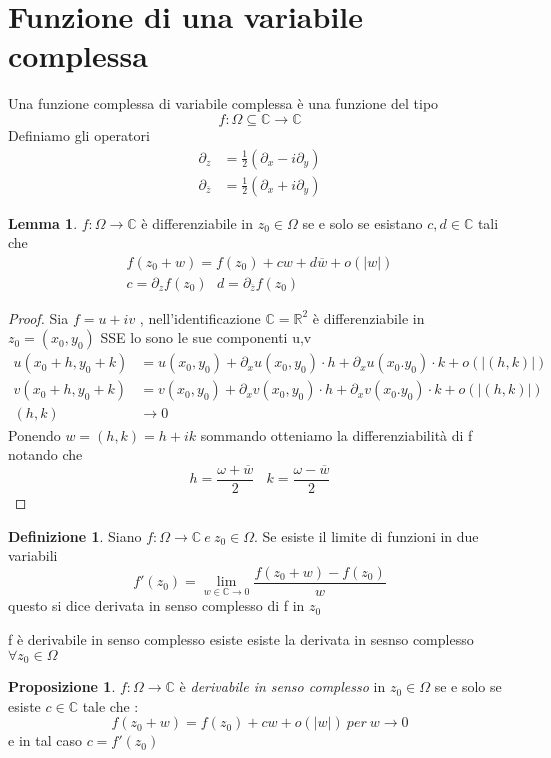\documentclass{article}
\theoremstyle{definition}
\newtheorem*{definizione}{Definizione}
\newtheorem*{proposizione}{Proposizione}
\newtheorem*{lemma}{Lemma}
\newcommand{\R}{\mathbb{R}}
\newcommand{\C}{\mathbb{C}}
\newcommand{\norm}[1]{|#1|}
\begin{document}
\section{Funzione di una variabile complessa}
Una funzione complessa di variabile complessa è una funzione del tipo 
$$f:\Omega \subseteq \mathbb{C} \rightarrow \mathbb{C}$$
Definiamo gli operatori 
\begin{align*}
	\partial_z&=\frac{1}{2}(\partial_x - i \partial_y)\\
		\partial_{\overline{z}}&=\frac{1}{2}(\partial_x + i \partial_y)
\end{align*}
	\begin{lemma}
		$f: \Omega \rightarrow\C$ è differenziabile in $z_0\in \Omega$ se e solo se esistano $c,d\in \C$ tali che 
		\begin{align*}
		f(z_0+w)=f(z_0)+cw+d\overline{w}+o(\norm{w})\\
		c=\partial_zf(z_0) \ \ \ d=\partial_{\overline{z}}f(z_0)
			\end{align*}
	\end{lemma}
	\begin{proof}
		Sia $f=u+iv$ , nell'identificazione $\C=\R^2$ è differenziabile in $z_0=(x_0,y_0)$ SSE lo sono le sue componenti u,v
		\begin{align*}
			u(x_0+h,y_0+k)&=u(x_0,y_0)+\partial_xu(x_0,y_0) \cdot h +\partial_xu(x_0.y_0) \cdot k+o(\norm{(h,k)})\\
			v(x_0+h,y_0+k)&=v(x_0,y_0)+\partial_xv(x_0,y_0) \cdot h +\partial_xv(x_0.y_0) \cdot k+o(\norm{(h,k)}) \\ 
			(h,k)&\rightarrow 0
		\end{align*}
		Ponendo $w=(h,k)=h+ik$ sommando otteniamo la differenziabilità di f notando che 
		$$h=\frac{\omega+\overline{w}}{2} \ \ \  \ k=\frac{\omega-\overline{w}}{2}  $$
	\end{proof}
	\begin{definizione}
		Siano $f:\Omega\rightarrow \C \ e \ z_0 \in \Omega$. Se esiste il limite di funzioni in due variabili 
		$$f'(z_0)=\lim_{w\in \C\rightarrow 0}\frac{f(z_0+w)-f(z_0)}{w}$$ questo si dice derivata in senso complesso di f in $z_0$
	\end{definizione}
	f è derivabile in senso complesso esiste esiste la derivata in sesnso complesso $\forall z_0 \in \Omega$
	\begin{proposizione}
		$f:\Omega \rightarrow \C$ è \textit{derivabile in senso complesso} in $z_0 \in \Omega $ se e solo se esiste $c \in \C$ tale che :
		$$f(z_0+w)=f(z_0)+cw+o(\norm{w}) \ per \ w \rightarrow 0$$ e in tal caso $c=f'(z_0)$
	\end{proposizione}
\end{document}
